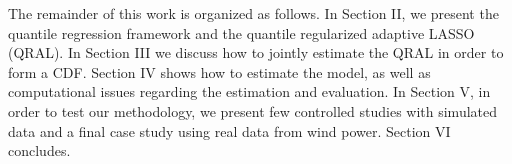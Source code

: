 The remainder of this work is organized as follows. In Section II, we present the quantile regression framework and the quantile regularized adaptive LASSO (QRAL). In Section III we discuss how to jointly estimate the QRAL in order to form a CDF. Section IV shows how to estimate the model, as well as computational issues regarding the estimation and evaluation. In Section V, in order to test our methodology, we present few controlled studies with simulated data and a final case study using real data from wind power. Section VI concludes.

